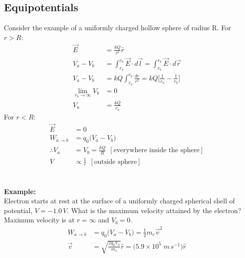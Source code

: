 \documentclass[a4paper, 11pt, normalem]{report}
\begin{document}
\section{Equipotentials}
Consider the example of a uniformly charged hollow sphere of radius R. 
For $r > R$:
\begin{align}
    \vec{E} &= \frac{kQ}{r^{2}} \hat{r} \\
    V_{a} - V_{b} &= \int_{r_{a}}^{r_{b}} \vec{E} \cdot d\vec{l} = \int_{r_{a}}^{r_{b}} \vec{E} \cdot d\vec{r} \\
    V_{a} - V_{b} &= kQ \int_{r_{a}}^{r_{b}} \frac{dr}{r^{2}} = kQ \Big[ \frac{1}{r_{a}} - \frac{1}{r_{b}} \Big] \\
    \lim_{r_{b} \to \infty} V_{b} &= 0 \\
    V_{a} &= \frac{kQ}{r_{a}}
\end{align}
For $r < R$:
\begin{align}
    \vec{E} &= 0 \\
    W_{a \to b}&= q_{0}\big(V_{a} - V_{b} \big) \\
    \therefore V_{a} &= V_{b} = \frac{kQ}{R} ~~[\text{everywhere inside the sphere}] \\
    V &\propto \frac{1}{r} ~~[\text{outside sphere}]
\end{align}

\chapter{}
\textbf{Example:}\\
Electron starts at rest at the surface of a uniformly charged spherical shell of potential, $V = -1.0\,V$. 
What is the maximum velocity attained by the electron?
Maximum velocity is at $r = \infty$ and $V_{b} = 0$.
\begin{align}
    W_{a \to b} &= q_{0} \big(V_{a} - V_{b} \big) = \tfrac{1}{2}m_{e}\vec{v}^{2} \\
    \vec{v} &= \sqrt{\frac{2q_{0}V_{a}}{m_{e}}} \hat{r} = \big(5.9 \times 10^{5} \; m\,s^{-1} \big) \hat{r}
\end{align}
\end{document}
